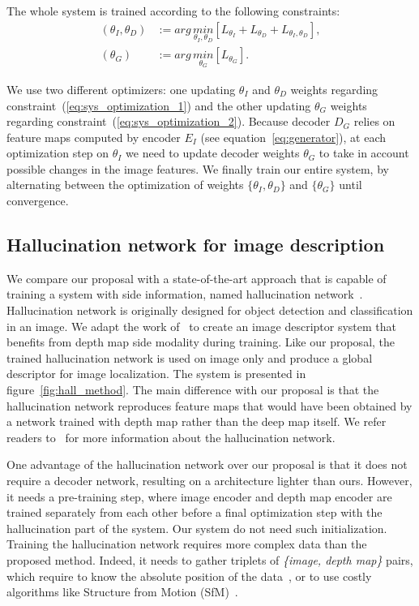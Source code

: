 The whole system is trained according to the following constraints:
\begin{align}
	\left( \theta_{I}, \theta_{D} \right) & := arg\,\underset{\theta_{I}, \theta_{D}}{min} \left[ L_{\theta_{I}} + L_{\theta_{D}} + L_{\theta_{I},\theta_{D}} \right], \label{eq:sys_optimization_1} \\ 	
	\left( \theta_{G} \right) & := arg\,\underset{\theta_{G}}{min} \left[ L_{\theta_{G}} \right]. 	\label{eq:sys_optimization_2}
\end{align}

We use two different optimizers: one updating $\theta_{I}$ and $\theta_{D}$ weights regarding constraint~(\ref{eq:sys_optimization_1}) and the other updating $\theta_{G}$ weights regarding constraint~(\ref{eq:sys_optimization_2}). Because decoder $D_G$ relies on feature maps computed by encoder $E_I$ (see equation~\ref{eq:generator}), at each optimization step on $\theta_{I}$ we need to update decoder weights $\theta_{G}$ to take in account possible changes in the image features. We finally train our entire system, by alternating between the optimization of weights $\{\theta_{I}, \theta_{D}\}$ and $\{\theta_G\}$ until convergence.

\subsection{Hallucination network for image description}
\label{subsec:hall}
We compare our proposal with a state-of-the-art approach that is capable of training a system with side information, named hallucination network~\cite{Hoffman2016}. Hallucination network is originally designed for object detection and classification in an image. We adapt the work of~\cite{Hoffman2016} to create an image descriptor system that benefits from depth map side modality during training. Like our proposal, the trained hallucination network is used on image only and produce a global descriptor for image localization. The system is presented in figure~\ref{fig:hall_method}. The main difference with our proposal is that the hallucination network reproduces feature maps that would have been obtained by a network trained with depth map rather than the deep map itself. We refer readers to~\cite{Hoffman2016} for more information about the hallucination network.

One advantage of the hallucination network over our proposal is that it does not require a decoder network, resulting on a architecture lighter than ours. However, it needs a pre-training step, where image encoder and depth map encoder are trained separately from each other before a final optimization step with the hallucination part of the system. Our system do not need such initialization. Training the hallucination network requires more complex data than the proposed method. Indeed, it needs to gather triplets of \textit{\{image, depth map\}} pairs, which require to know the absolute position of the data~\cite{Arandjelovic2017,Liu2018}, or to use costly algorithms like Structure from Motion (SfM)~\cite{Godard2017,Radenovic2017,Kim2017a}. 

